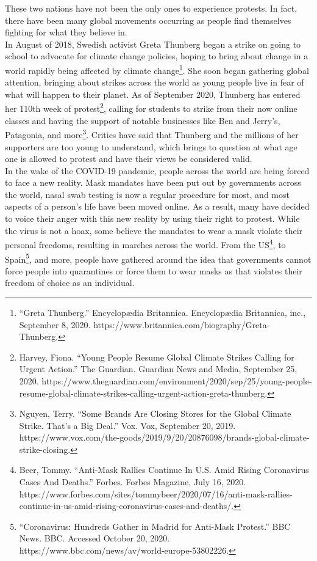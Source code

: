 \documentclass[10pt, letterpaper]{article}
\begin{document}
These two nations have not been the only ones to experience protests. In
fact, there have been many global movements occurring as people find
themselves fighting for what they believe in. \\

In August of 2018, Swedish activist Greta Thunberg began a strike on
going to school to advocate for climate change policies, hoping to bring
about change in a world rapidly being affected by climate
change\footnote{``Greta Thunberg.'' Encyclopædia Britannica.
  Encyclopædia Britannica, inc., September 8, 2020.
  https://www.britannica.com/biography/Greta-Thunberg.}. She soon began
gathering global attention, bringing about strikes across the world as
young people live in fear of what will happen to their planet. As of
September 2020, Thunberg has entered her 110th week of
protest\footnote{Harvey, Fiona. ``Young People Resume Global Climate
  Strikes Calling for Urgent Action.'' The Guardian. Guardian News and
  Media, September 25, 2020.
  https://www.theguardian.com/environment/2020/sep/25/young-people-resume-global-climate-strikes-calling-urgent-action-greta-thunberg.},
calling for students to strike from their now online classes and having
the support of notable businesses like Ben and Jerry's, Patagonia, and
more\footnote{Nguyen, Terry. ``Some Brands Are Closing Stores for the
  Global Climate Strike. That's a Big Deal.'' Vox. Vox, September 20,
  2019.
  https://www.vox.com/the-goods/2019/9/20/20876098/brands-global-climate-strike-closing.}.
Critics have said that Thunberg and the millions of her supporters are
too young to understand, which brings to question at what age one is
allowed to protest and have their views be considered valid. \\

In the wake of the COVID-19 pandemic, people across the world are being
forced to face a new reality. Mask mandates have been put out by
governments across the world, nasal swab testing is now a regular
procedure for most, and most aspects of a person's life have been moved
online. As a result, many have decided to voice their anger with this
new reality by using their right to protest. While the virus is not a
hoax, some believe the mandates to wear a mask violate their personal
freedoms, resulting in marches across the world. From the US\footnote{Beer,
  Tommy. ``Anti-Mask Rallies Continue In U.S. Amid Rising Coronavirus
  Cases And Deaths.'' Forbes. Forbes Magazine, July 16, 2020.
  https://www.forbes.com/sites/tommybeer/2020/07/16/anti-mask-rallies-continue-in-us-amid-rising-coronavirus-cases-and-deaths/.},
to Spain\footnote{``Coronavirus: Hundreds Gather in Madrid for Anti-Mask
  Protest.'' BBC News. BBC. Accessed October 20, 2020.
  https://www.bbc.com/news/av/world-europe-53802226.}, and more, people
have gathered around the idea that governments cannot force people into
quarantines or force them to wear masks as that violates their freedom
of choice as an individual. \\
\end{document}
